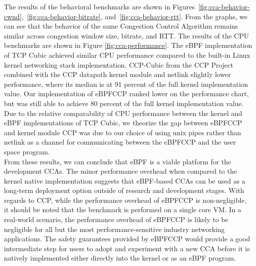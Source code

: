 \documentclass[../main.tex]{subfiles}
\begin{document}
The results of the behavioral benchmarks are shown in Figures~\ref{fig:cca-behavior-cwnd},~\ref{fig:cca-behavior-bitrate}, and~\ref{fig:cca-behavior-rtt}. From the graphs, we can see that the behavior of the same Congestion Control Algorithm remains similar across congestion window size, bitrate, and RTT. The results of the CPU benchmarks are shown in Figure \ref{fig:cca-performance}. The eBPF implementation of TCP Cubic achieved similar CPU performance compared to the built-in Linux kernel networking stack implementation. CCP-Cubic from the CCP Project \cite{generic-cong-avoid} combined with the CCP datapath kernel module and netlink slightly lower performance, where its median is at 91 percent of the full kernel implementation value. Our implementation of eBPFCCP ranked lower on the performance chart, but was still able to achieve 80 percent of the full kernel implementation value. Due to the relative comparability of CPU performance between the kernel and eBPF implementations of TCP Cubic, we theorize the gap between eBPFCCP and kernel module CCP was due to our choice of using unix pipes rather than netlink as a channel for communicating between the eBPFCCP and the user space program. \\
From these results, we can conclude that eBPF is a viable platform for the development CCAs. The minor performance overhead when compared to the kernel native implementation suggests that eBPF-based CCAs can be used as a long-term deployment option outside of research and development stages. With regards to CCP, while the performance overhead of eBPFCCP is non-negligible, it should be noted that the benchmark is performed on a single core VM. In a real-world scenario, the performance overhead of eBPFCCP is likely to be negligible for all but the most performance-sensitive industry networking applications. The safety guarantees provided by eBPFCCP would provide a good intermediate step for users to adopt and experiment with a new CCA before it is natively implemented either directly into the kernel or as an eBPF program. 
\end{document}
